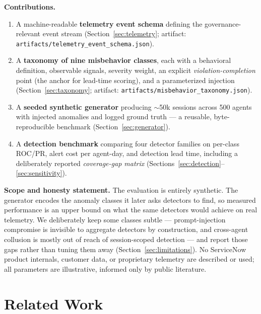 \documentclass[10pt]{article}
\newcommand{\code}[1]{\texttt{#1}}
\begin{document}
\noindent\textbf{Contributions.}
\begin{enumerate}
  \item A machine-readable \textbf{telemetry event schema} defining the
        governance-relevant event stream (Section~\ref{sec:telemetry}; artifact:
        \code{artifacts/telemetry\_event\_schema.json}).
  \item A \textbf{taxonomy of nine misbehavior classes}, each with a behavioral
        definition, observable signals, severity weight, an explicit
        \emph{violation-completion} point (the anchor for lead-time scoring),
        and a parameterized injection (Section~\ref{sec:taxonomy}; artifact:
        \code{artifacts/misbehavior\_taxonomy.json}).
  \item A \textbf{seeded synthetic generator} producing $\sim$50k sessions
        across 500 agents with injected anomalies and logged ground truth ---
        a reusable, byte-reproducible benchmark
        (Section~\ref{sec:generator}).
  \item A \textbf{detection benchmark} comparing four detector families on
        per-class ROC/PR, alert cost per agent-day, and detection lead time,
        including a deliberately reported \emph{coverage-gap matrix}
        (Sections~\ref{sec:detection}--\ref{sec:sensitivity}).
\end{enumerate}

\noindent\textbf{Scope and honesty statement.} The evaluation is entirely
synthetic. The generator encodes the anomaly classes it later asks detectors to
find, so measured performance is an upper bound on what the same detectors
would achieve on real telemetry. We deliberately keep some classes subtle ---
prompt-injection compromise is invisible to aggregate detectors by
construction, and cross-agent collusion is mostly out of reach of
session-scoped detection --- and report those gaps rather than tuning them
away (Section~\ref{sec:limitations}). No ServiceNow product internals,
customer data, or proprietary telemetry are described or used; all parameters
are illustrative, informed only by public literature.

\section{Related Work}
\label{sec:related}
\end{document}
